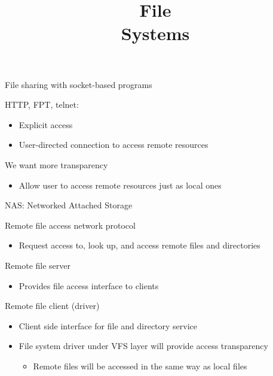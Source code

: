 

\title{File\\Systems}



\begin{frame}
    \titlepage
\end{frame}

\begin{slide}

	
	File sharing with socket-based programs
	\bigskip
	
	HTTP, FPT, telnet:
	\begin{itemize}
		\item Explicit access
		\item User-directed connection to access remote resources
	\end{itemize}
	\bigskip
	
	We want more transparency
	\begin{itemize}
		\item Allow user to access remote resources just as local ones
	\end{itemize}
	\bigskip
	
	NAS: Networked Attached Storage

\end{slide}

\begin{slide}

	
	Remote file access network protocol
	\begin{itemize}
		\item Request access to, look up, and access remote files and directories
	\end{itemize}
	\bigskip
	
	Remote file server
	\begin{itemize}
		\item Provides file access interface to clients
	\end{itemize}
	\bigskip
	
	Remote file client (driver)
	\begin{itemize}
		\item Client side interface for file and directory service
		\item File system driver under VFS layer will provide access transparency
		\begin{itemize}
			\item Remote files will be accessed in the same way as local files
		\end{itemize}
	\end{itemize}
	
\end{slide}

